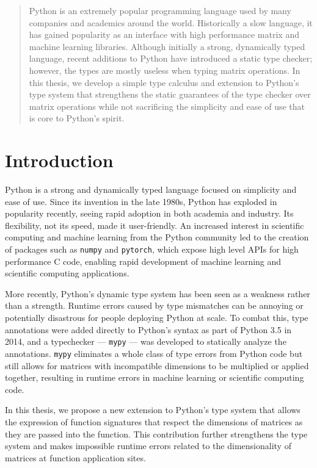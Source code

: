 \documentclass{article}
\begin{document}
\tableofcontents
\newpage

\begin{abstract}
    Python is an extremely popular programming language used by many companies and academics around the world. Historically a slow language, it has gained popularity as an interface with high performance matrix and machine learning libraries. Although initially a strong, dynamically typed language, recent additions to Python have introduced a static type checker; however, the types are mostly useless when typing matrix operations. In this thesis, we develop a simple type calculus and extension to Python's type system that strengthens the static guarantees of the type checker over matrix operations while not sacrificing the simplicity and ease of use that is core to Python's spirit.
\end{abstract}

\section{Introduction}

Python is a strong and dynamically typed language focused on simplicity and ease of use. Since its invention in the late 1980s, Python has exploded in popularity recently, seeing rapid adoption in both academia and industry. Its flexibility, not its speed, made it user-friendly. An increased interest in scientific computing and machine learning from the Python community led to the creation of packages such as \texttt{numpy} and \texttt{pytorch}, which expose high level APIs for high performance C code, enabling rapid development of machine learning and scientific computing applications.

More recently, Python's dynamic type system has been seen as a weakness rather than a strength. Runtime errors caused by type mismatches can be annoying or potentially disastrous for people deploying Python at scale. To combat this, type annotations were added directly to Python's syntax as part of Python 3.5 in 2014, and a typechecker --- \texttt{mypy} --- was developed to statically analyze the annotations. \texttt{mypy} eliminates a whole class of type errors from Python code but still allows for matrices with incompatible dimensions to be multiplied or applied together, resulting in runtime errors in machine learning or scientific computing code.

In this thesis, we propose a new extension to Python's type system that allows the expression of function signatures that respect the dimensions of matrices as they are passed into the function. This contribution further strengthens the type system and makes impossible runtime errors related to the dimensionality of matrices at function application sites.
\end{document}

